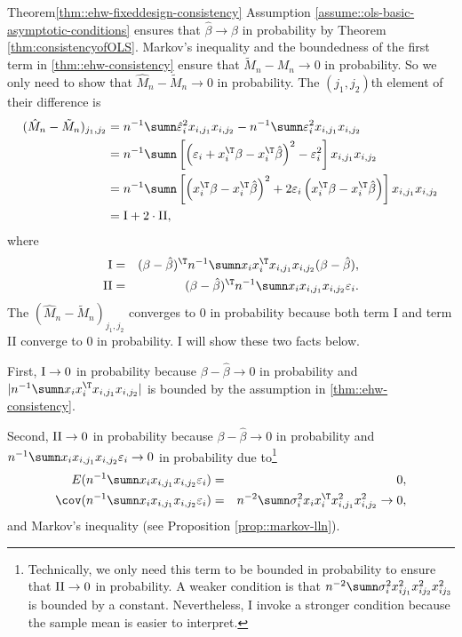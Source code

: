 \begin{myproof}{Theorem}{\ref{thm::ehw-fixeddesign-consistency}}
Assumption \ref{assume::ols-basic-asymptotic-conditions} ensures that $\hat{\beta}\rightarrow\beta$
in probability by Theorem \ref{thm:consistencyofOLS}. Markov's inequality and the boundedness of the first term in \eqref{thm::ehw-consistency}
ensure that $\tilde{M}_{n}-M_{n}\rightarrow0$ in probability. So
we only need to show that $\hat{M}_{n}-\tilde{M}_{n}\rightarrow0$
in probability. The $(j_{1},j_{2})$th element of their difference
is
\begin{align*}
(\hat{M}_{n}-\tilde{M}_{n})_{j_{1},j_{2}} & =n^{-1}\sumn\hat{\varepsilon}_{i}^{2}x_{i,j_{1}}x_{i,j_{2}}-n^{-1}\sumn\varepsilon_{i}^{2}x_{i,j_{1}}x_{i,j_{2}}\\
 & =n^{-1}\sumn\left[\left(\varepsilon_{i}+x_{i}^{\T}\beta-x_{i}^{\T}\hat{\beta}\right)^{2}-\varepsilon_{i}^{2}\right]x_{i,j_{1}}x_{i,j_{2}}\\
 & =n^{-1}\sumn\left[\left(x_{i}^{\T}\beta-x_{i}^{\T}\hat{\beta}\right)^{2}+2\varepsilon_{i}\left(x_{i}^{\T}\beta-x_{i}^{\T}\hat{\beta}\right)\right]x_{i,j_{1}}x_{i,j_{2}}\\
 & = \textup{I}  + 2 \cdot \textup{II} , 
\end{align*}
where
\begin{eqnarray}
\textup{I} &=& (\beta-\hat{\beta})^{\T}n^{-1}\sumn x_{i}x_{i}^{\T}x_{i,j_{1}}x_{i,j_{2}}(\beta-\hat{\beta}) ,  \\
\textup{II} &=& (\beta-\hat{\beta})^{\T}n^{-1}\sumn x_{i}x_{i,j_{1}}x_{i,j_{2}}\varepsilon_{i}.
\end{eqnarray}
The $(\hat{M}_{n}-\tilde{M}_{n})_{j_{1},j_{2}}$ converges to 0 in probability because both term I and term II converge to 0 in probability. I will show these two facts below. 

First,  $\textup{I} \rightarrow 0$ in probability because $\beta-\hat{\beta} \rightarrow 0$ in probability and $ | n^{-1}\sumn x_{i}x_{i}^{\T}x_{i,j_{1}}x_{i,j_{2}} | $ is bounded by the assumption in \eqref{thm::ehw-consistency}.

Second, $\textup{II} \rightarrow 0$ in probability because $\beta-\hat{\beta} \rightarrow 0$ in probability and $n^{-1}\sumn x_{i}x_{i,j_{1}}x_{i,j_{2}}\varepsilon_{i} \rightarrow 0$ in probability due to\footnote{Technically, we only need this term to be bounded in probability to ensure that $\textup{II} \rightarrow 0$ in probability. A weaker condition is that $n^{-2}\sumn\sigma_{i}^{2}x_{ij_{1}}^{2}x_{ij_{2}}^{2}x_{ij_{3}}^{2}$ is bounded by a constant. Nevertheless, I invoke a stronger condition because the sample mean is easier to interpret.} 
\begin{eqnarray*}
E(n^{-1}\sumn x_{i}x_{i,j_{1}}x_{i,j_{2}}\varepsilon_{i}) &=& 0,\\
\cov(n^{-1}\sumn x_{i}x_{i,j_{1}}x_{i,j_{2}}\varepsilon_{i}) &=& n^{-2} \sumn \sigma_i^2 x_{i} x_{i}^{\T}  x_{i,j_{1}}^2 x_{i,j_{2}}^2 \rightarrow 0, 
\end{eqnarray*}
and Markov's inequality (see Proposition \ref{prop::markov-lln}). 
\end{myproof}



